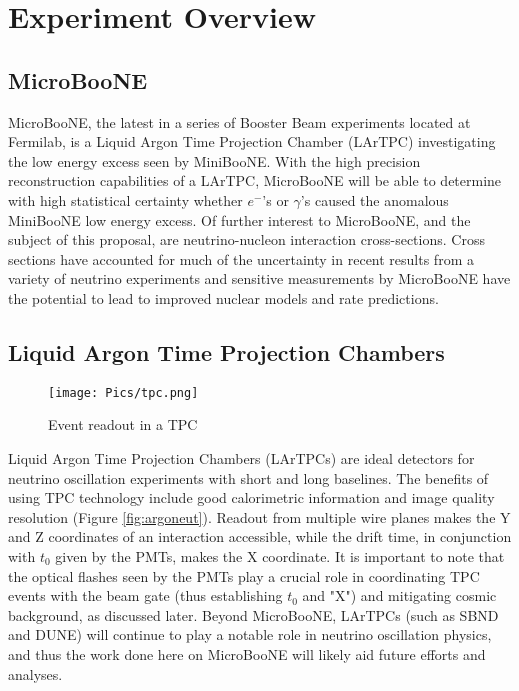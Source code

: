 \documentclass[12pt]{article}
\begin{document}
\pagestyle{fancy}%
\fancyhead[C]{}
\renewcommand{\headrulewidth}{0.4pt}%
\tableofcontents
\setcounter{tocdepth}{3} 
\clearpage

\section{Experiment Overview}
\subsection{MicroBooNE}
MicroBooNE, the latest in a series of Booster Beam experiments located at Fermilab, is a Liquid Argon Time Projection Chamber (LArTPC) investigating the low energy excess seen by MiniBooNE. With the high precision reconstruction capabilities of a LArTPC, MicroBooNE will be able to determine with high statistical certainty whether $e^-$'s or $\gamma$'s caused the anomalous MiniBooNE low energy excess. Of further interest to MicroBooNE, and the subject of this proposal, are neutrino-nucleon interaction cross-sections. Cross sections have accounted for much of the uncertainty in recent results from a variety of neutrino experiments\cite{miniboone} and sensitive measurements by MicroBooNE have the potential to lead to improved nuclear models and rate predictions. 

\subsection{Liquid Argon Time Projection Chambers}
\begin{figure}[h!]
\centering
\texttt{[image: Pics/tpc.png]}
\caption{Event readout in a TPC}
\end{figure}
\par Liquid Argon Time Projection Chambers (LArTPCs) are ideal detectors for neutrino oscillation experiments with short and long baselines. The benefits of using TPC technology include good calorimetric information and image quality resolution (Figure \ref{fig:argoneut}).  Readout from multiple wire planes makes the Y and Z coordinates of an interaction accessible, while the drift time, in conjunction with $t_0$ given by the PMTs, makes the X coordinate. It is important to note that the optical flashes seen by the PMTs play a crucial role in coordinating TPC events with the beam gate (thus establishing $t_0$ and "X") and mitigating cosmic background, as discussed later. Beyond MicroBooNE, LArTPCs (such as SBND and DUNE) will continue to play a notable role in neutrino oscillation physics, and thus the work done here on MicroBooNE will likely aid future efforts and analyses. 
\end{document}
